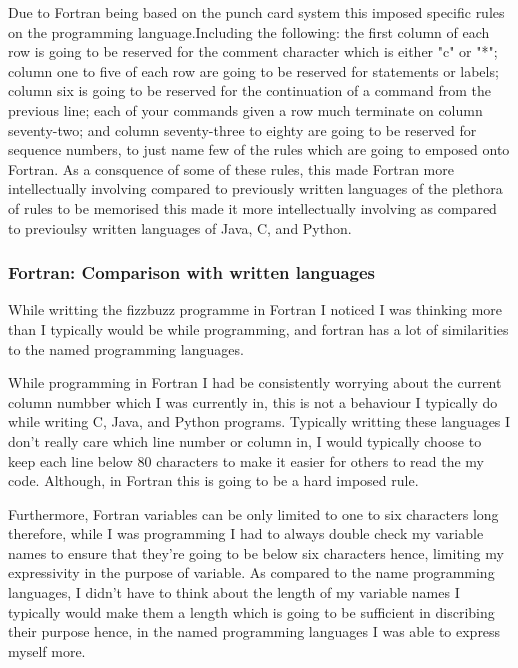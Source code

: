 \documentclass[
	12pt, %
]{fphw}
\begin{document}
Due to Fortran being based on the punch card system this imposed specific
rules on the programming language.Including the following:
the first column of each row is going to be reserved for
the comment character which is either "c" or "*"; column one to five of each row
are going to be reserved for statements or labels; column six is going to be
reserved for the continuation of a command from the previous line; each of your
commands given a row much terminate on column seventy-two; and column seventy-three
to eighty are going to be reserved for sequence numbers, to just name few of the rules
which are going to emposed onto Fortran. As a consquence of some of these rules,
this made Fortran more intellectually involving compared to previously written
languages
of the plethora of rules
to be memorised this made it more intellectually involving as compared to
previoulsy written languages of Java, C, and Python. \par

\subsubsection{Fortran: Comparison with written languages}

While writting the fizzbuzz programme in Fortran I noticed I was thinking more than I typically would be
while programming, and fortran has a lot of similarities to the named programming
languages. \par

While programming in Fortran I had be consistently worrying about the current
column numbber which I was currently in, this is not a behaviour I typically
do while writing C, Java, and Python programs. Typically writting these languages
I don't really care which line number or column in, I would typically choose to
keep each line below 80 characters to make it easier for others to read the my code.
Although, in Fortran this is going to be a hard imposed rule. \par

Furthermore, Fortran variables can be only limited to one to six characters long
therefore, while I was programming I had to always double check my variable names
to ensure that they're going to be below six characters hence, limiting my expressivity
in the purpose of variable. As compared to the name programming languages, I didn't
have to think about the length of my variable names I typically would make them
a length which is going to be sufficient in discribing their purpose hence, in the
named programming languages I was able to express myself more. \par
\end{document}
